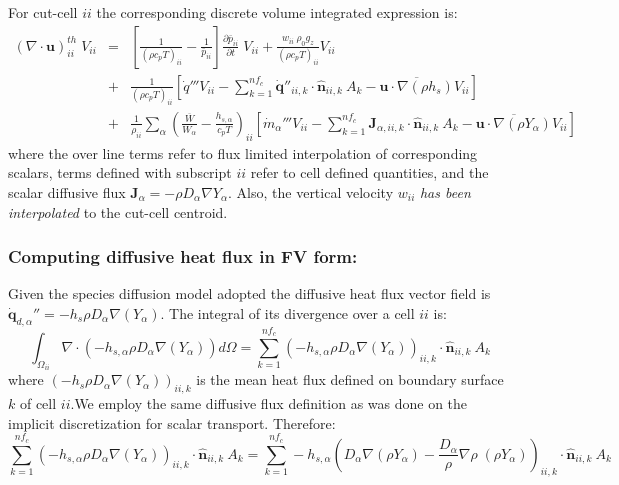 \documentclass[12pt]{article}
\begin{document}
For cut-cell $ii$ the corresponding discrete volume integrated expression is:
%
\begin{eqnarray}
    ( \nabla \cdot \mathbf{u} )_{ii}^{th} \; V_{ii} &=&
    \left[ \frac{1}{(\rho c_p T)_{ii}} - \frac{1}{\bar{p}_{ii}} \right]
    \frac{\partial \bar{p}_{ii}}{\partial t} \; V_{ii} +
    \frac{w_{ii} \: \rho_0 g_z}{(\rho c_p T)_{ii}} V_{ii} \nonumber \\
    &+& \frac{1}{(\rho c_p T)_{ii}} \left[ \dot{q}''' V_{ii} -
    \sum_{k=1}^{nf_c} \dot{\mathbf{q}}''_{ii,k} \cdot \hat{\mathbf{n}}_{ii,k} \: A_k
    - \overline{\mathbf{u} \cdot \nabla (\rho h_s)} V_{ii} \right] \nonumber \\
    &+& \frac{1}{\rho_{ii}} \sum_\alpha \left( \frac{\overline{W}}{W_\alpha} - \frac{h_{s,\alpha}}{c_p T} \right)_{ii} \left[ \dot{m}_\alpha''' V_{ii} -
    \sum_{k=1}^{nf_c} \mathbf{J}_{\alpha,ii,k} \cdot \hat{\mathbf{n}}_{ii,k} \: A_k
    - \overline{\mathbf{u} \cdot \nabla (\rho Y_\alpha)} V_{ii} \right] \label{eq:divth2}
\end{eqnarray}
%
where the over line terms refer to flux limited interpolation of corresponding scalars, terms defined with subscript $ii$ refer to cell defined quantities, and the scalar diffusive flux $\mathbf{J}_\alpha=- \rho D_\alpha \nabla Y_\alpha$. Also, the vertical velocity $w_{ii}$ \textit{has been interpolated} to the cut-cell centroid.

\subsubsection{Computing diffusive heat flux in FV form:}

Given the species diffusion model adopted the diffusive heat flux vector field is $\dot{\mathbf{q}}_{d,\alpha}''=-h_s \rho D_\alpha \nabla(Y_\alpha)$. The integral of its divergence over a cell $ii$ is:
\begin{equation}
    \int_{\Omega_{ii}} {\nabla \cdot \left(-h_{s,\alpha} \rho D_\alpha \nabla(Y_\alpha) \right)} d\Omega = \sum_{k=1}^{nf_c} \left(-h_{s,\alpha} \rho D_\alpha \nabla(Y_\alpha) \right)_{ii,k} \cdot \hat{\mathbf{n}}_{ii,k}  \: A_k
\end{equation}
where $\left(-h_s \rho D_\alpha \nabla(Y_\alpha) \right)_{ii,k}$ is the mean heat flux defined on boundary surface $k$ of cell $ii$.We employ the same diffusive flux definition as was done on the implicit discretization for scalar transport. Therefore:
\begin{equation}
    \sum_{k=1}^{nf_c} \left(-h_{s,\alpha} \rho D_\alpha \nabla(Y_\alpha) \right)_{ii,k} \cdot \hat{\mathbf{n}}_{ii,k}  \: A_k =
    \sum_{k=1}^{nf_c} -h_{s,\alpha} \left(D_\alpha \nabla(\rho Y_\alpha) -
    \frac{D_\alpha}{\rho} \nabla \rho \; (\rho Y_\alpha) \right)_{ii,k} \cdot \hat{\mathbf{n}}_{ii,k}  \: A_k
\end{equation}
\end{document}
